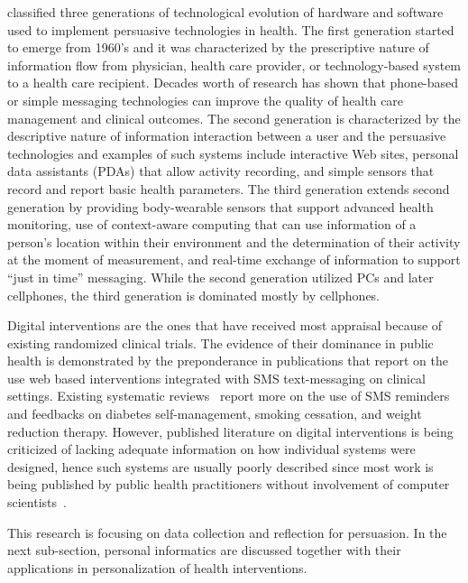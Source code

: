 \cite{chatterjee2009healthy} classified three generations  of technological evolution of hardware and software used to implement persuasive technologies in health. The first generation started to emerge from 1960's and it was characterized by the prescriptive nature of information flow from physician, health care provider, or technology-based system to a health care recipient. Decades worth of research has shown that phone-based or simple messaging technologies can improve the quality of health care management and clinical outcomes. The second generation is characterized by the descriptive nature of information interaction between a user and the persuasive technologies and examples of such systems include interactive Web sites, personal data assistants (PDAs) that allow activity recording, and simple sensors that record and report basic health parameters. The third generation extends second generation by providing body-wearable sensors that support advanced health monitoring, use of context-aware computing that can use information of a person's location within their environment and the determination of their activity at the moment of measurement, and real-time exchange of information to support “just in time” messaging.  While the second generation utilized PCs and later cellphones, the third generation is dominated mostly by cellphones.

Digital interventions are the ones that have received most appraisal because of existing randomized clinical trials. The evidence of their dominance in public health is demonstrated by the preponderance in publications that report on the use web based interventions integrated with SMS text-messaging on clinical settings. Existing systematic reviews~\citep{cole2010text,fjeldsoe2009behavior,krishna2009healthcare} report more on the use of SMS reminders and feedbacks on diabetes self-management, smoking cessation, and weight reduction therapy. However, published literature on digital interventions is being criticized of lacking adequate information on how individual systems were designed, hence such systems are usually poorly described since most work is being published by public health practitioners without involvement of computer scientists~\citep{Oinas-Kukkonen:foundation}.
 
This research is focusing on data collection and reflection for persuasion. In the next sub-section, personal informatics are discussed together with their applications in personalization of health interventions. 
